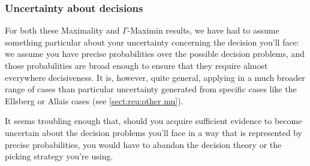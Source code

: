 \documentclass[a4paper,final]{article}
\newtheorem{proposition}[theorem]{Proposition}
\newcommand\EU{\mathrm{EU}}
\newenvironment{CCM rewritten}
{\begingroup\color{blue}} %
{\endgroup}              %
\begin{document}
%
%



	\subsubsection{Uncertainty about decisions}
	For both these Maximality and $\Gamma$-Maximin results, we have had to assume something particular about your uncertainty concerning the decision you'll face: we assume you have precise probabilities over the possible decision problems, and those probabilities are broad enough to ensure that they require almost everywhere decisiveness. It is, however, quite general, applying in a much broader range of cases than particular uncertainty generated from specific cases like the Ellsberg or Allais cases (see \cref{sect:reu:other mu}).
	
	
	It seems troubling enough that, should you acquire sufficient evidence to become uncertain about the decision problems you'll face in a way that is represented by precise probabilities, you would have to abandon the decision theory or the picking strategy you're using. 
\end{document}
